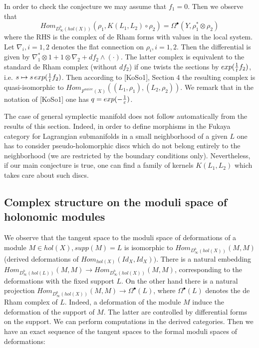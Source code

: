 \documentclass[a4paper,12pt]{article}
\begin{document}
In order to check the conjecture we may assume that $f_1=0$. Then we observe that
$$Hom_{D^b_{\infty}(hol(X))}(\rho_1,K(L_1,L_2)\circ \rho_2)=
\Omega^{\bullet}(Y,\rho^{\ast}_1\otimes \rho_2)$$
 where the RHS
is the complex of de Rham forms with values in the local system. Let $\nabla_i, i=1,2$
denotes the flat connection on $\rho_i, i=1,2$. Then the
differential is given by $\nabla_1^{\ast}\otimes 1+1\otimes \nabla_2+
df_2\wedge (\cdot)$. The latter complex is equivalent to the standard
de Rham complex (without $df_2$) if one twists the sections by
$exp({1\over t}f_2)$, i.e. $s\mapsto s\,exp({1\over t}f_2)$. Then according to [KoSo1], Section 4
the resulting complex is quasi-isomorphic to 
$Hom_{F^{naive}(X)}((L_1,\rho_1),(L_2,\rho_2))$. 
We remark that in the notation of [KoSo1] one has $q=exp(-{1\over \varepsilon})$.

\begin{rmk} The case of general symplectic manifold does not follow
automatically from the results of this section. Indeed, in order
to define morphisms in the Fukaya category for
Lagrangian submanifolds in a small neighborhood of a given
$L$  one has to consider pseudo-holomorphic
discs which do not belong entirely to the neighborhood (we are restricted by the boundary
conditions only). Nevertheless, if our main conjecture is true, one can find
a family of kernels $K(L_1,L_2)$ which takes care about such discs. 



\end{rmk}







\subsection{Complex structure on the moduli space of holonomic modules}

We observe that the tangent space to the moduli space of
deformations of a module $M\in hol(X), supp(M)=L$ is isomorphic 
to $Hom_{D^b_{\infty}(hol(X))}(M,M)$ (derived deformations of $Hom_{hol(X)}(Id_X,Id_X))$.
There is a natural embedding $Hom_{D^b_{\infty}(hol(L))}(M,M)\to Hom_{D^b_{\infty}(hol(X))}(M,M)$,
corresponding to the deformations with the fixed support $L$.
On the other hand there is a natural projection
$Hom_{D^b_{\infty}(hol(X))}(M,M) \to \Omega^{\bullet}(L)$, where  $\Omega^{\bullet}(L)$
denotes the de Rham complex of $L$. Indeed,
a deformation of the module $M$
induce the deformation of the support of $M$. The latter
are controlled by differential forms on the support.
We can perform computations in the derived categories.
Then we have an exact sequence of the tangent spaces
to the formal moduli spaces of deformations:
\end{document}
